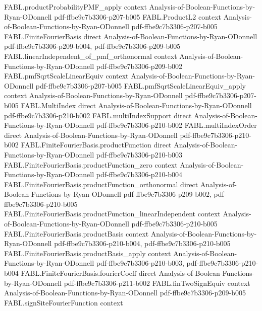 \begin{theorem}
\proofstep
  {FABL.productProbabilityPMF_apply}
  {context}
  {Analysis-of-Boolean-Functions-by-Ryan-ODonnell}
  {pdf-ffbe9c7b3306-p207-b005}
\proofstep
  {FABL.ProductL2}
  {context}
  {Analysis-of-Boolean-Functions-by-Ryan-ODonnell}
  {pdf-ffbe9c7b3306-p207-b005}
\proofstep
  {FABL.FiniteFourierBasis}
  {direct}
  {Analysis-of-Boolean-Functions-by-Ryan-ODonnell}
  {pdf-ffbe9c7b3306-p209-b004,
    pdf-ffbe9c7b3306-p209-b005}
\proofstep
  {FABL.linearIndependent_of_pmf_orthonormal}
  {context}
  {Analysis-of-Boolean-Functions-by-Ryan-ODonnell}
  {pdf-ffbe9c7b3306-p209-b002}
\proofstep
  {FABL.pmfSqrtScaleLinearEquiv}
  {context}
  {Analysis-of-Boolean-Functions-by-Ryan-ODonnell}
  {pdf-ffbe9c7b3306-p207-b005}
\proofstep
  {FABL.pmfSqrtScaleLinearEquiv_apply}
  {context}
  {Analysis-of-Boolean-Functions-by-Ryan-ODonnell}
  {pdf-ffbe9c7b3306-p207-b005}
\proofstep
  {FABL.MultiIndex}
  {direct}
  {Analysis-of-Boolean-Functions-by-Ryan-ODonnell}
  {pdf-ffbe9c7b3306-p210-b002}
\proofstep
  {FABL.multiIndexSupport}
  {direct}
  {Analysis-of-Boolean-Functions-by-Ryan-ODonnell}
  {pdf-ffbe9c7b3306-p210-b002}
\proofstep
  {FABL.multiIndexOrder}
  {direct}
  {Analysis-of-Boolean-Functions-by-Ryan-ODonnell}
  {pdf-ffbe9c7b3306-p210-b002}
\proofstep
  {FABL.FiniteFourierBasis.productFunction}
  {direct}
  {Analysis-of-Boolean-Functions-by-Ryan-ODonnell}
  {pdf-ffbe9c7b3306-p210-b003}
\proofstep
  {FABL.FiniteFourierBasis.productFunction_zero}
  {context}
  {Analysis-of-Boolean-Functions-by-Ryan-ODonnell}
  {pdf-ffbe9c7b3306-p210-b004}
\proofstep
  {FABL.FiniteFourierBasis.productFunction_orthonormal}
  {direct}
  {Analysis-of-Boolean-Functions-by-Ryan-ODonnell}
  {pdf-ffbe9c7b3306-p209-b002,
    pdf-ffbe9c7b3306-p210-b005}
\proofstep
  {FABL.FiniteFourierBasis.productFunction_linearIndependent}
  {context}
  {Analysis-of-Boolean-Functions-by-Ryan-ODonnell}
  {pdf-ffbe9c7b3306-p210-b005}
\proofstep
  {FABL.FiniteFourierBasis.productBasis}
  {context}
  {Analysis-of-Boolean-Functions-by-Ryan-ODonnell}
  {pdf-ffbe9c7b3306-p210-b004,
    pdf-ffbe9c7b3306-p210-b005}
\proofstep
  {FABL.FiniteFourierBasis.productBasis_apply}
  {context}
  {Analysis-of-Boolean-Functions-by-Ryan-ODonnell}
  {pdf-ffbe9c7b3306-p210-b003,
    pdf-ffbe9c7b3306-p210-b004}
\proofstep
  {FABL.FiniteFourierBasis.fourierCoeff}
  {direct}
  {Analysis-of-Boolean-Functions-by-Ryan-ODonnell}
  {pdf-ffbe9c7b3306-p211-b002}
\proofstep
  {FABL.finTwoSignEquiv}
  {context}
  {Analysis-of-Boolean-Functions-by-Ryan-ODonnell}
  {pdf-ffbe9c7b3306-p209-b005}
\proofstep
  {FABL.signSiteFourierFunction}
  {context}

\end{theorem}
